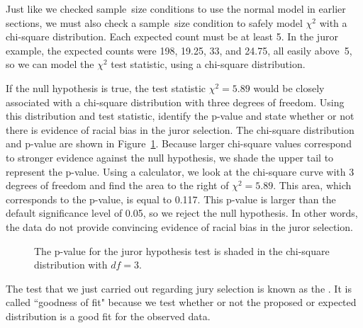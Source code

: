 Just like we checked sample~size conditions to use the normal model in earlier sections, we must also check a sample~size condition to safely model $\chi^2$ with a chi-square distribution. Each expected count must be at least 5. In the juror example, the expected counts were 198, 19.25, 33, and 24.75, all easily above~5, so we can model the $\chi^2$ test statistic, using a chi-square distribution.

\begin{examplewrap}
\begin{nexample}{If the null hypothesis is true, the test statistic $\chi^2=5.89$ would be closely associated with a chi-square distribution with three degrees of freedom. Using this distribution and test statistic, identify the p-value and state whether or not there is evidence of racial bias in the juror selection.}
The chi-square distribution and p-value are shown in Figure~\ref{jurorHTPValueShown}. Because larger chi-square values correspond to stronger evidence against the null hypothesis, we shade the upper tail to represent the p-value. Using a calculator, we look at the chi-square curve with 3 degrees of freedom and find the area to the right of $\chi^2=5.89$.  This area, which corresponds to the p-value, is equal to 0.117.  This p-value is larger than the default significance level of 0.05, so we reject the null hypothesis.  In other words, the data do not provide convincing evidence of racial bias in the juror selection.
\end{nexample}
\end{examplewrap}

\begin{figure}[h]
\centering
{}
\caption{The p-value for the juror hypothesis test is shaded in the chi-square distribution with $df=3$.}
\label{jurorHTPValueShown}
\end{figure}

The test that we just carried out regarding jury selection is known as the . It is called ``goodness of fit" because we test whether or not the proposed or expected distribution is a good fit for the observed data.

